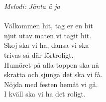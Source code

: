 {\footnotesize\textit{Melodi: Jänta å ja}}\\
\\
Välkommen hit, tag er en bit\\
njut utav maten vi tagit hit.\\
Skoj ska vi ha, dansa vi ska\\
trivas så där förtroligt.\\
Humöret på alla toppen ska nå\\
skratta och sjunga det ska vi få.\\
Nöjda med festen hemåt vi gå.\\
I kväll ska vi ha det roligt.
